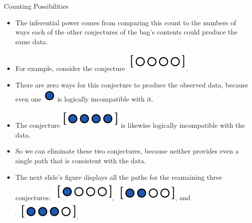 \documentclass[handout]{beamer}
\begin{document}
\begin{frame}{Counting Possibilities}
\scriptsize{
\begin{itemize}
 \item The inferential power comes from comparing this count to the numbers of ways each of the other conjectures of the bag's contents could produce the same data. 
 \item For example, consider the conjecture \includegraphics[scale=0.3]{pics/marbles10.png}. 
 \item There are zero ways for this conjecture to produce the observed data, because even one \includegraphics[scale=0.3]{pics/marbles6.png} is logically incompatible with it. 
\item The conjecture \includegraphics[scale=0.3]{pics/marbles11.png} is likewise logically incompatible with the data. 
\item So we can eliminate these two conjectures, because neither provides even a single path that is consistent with the data.
\item The next slide's figure displays all the paths for the reamaining three conjectures: \includegraphics[scale=0.3]{pics/marbles3.png}, \includegraphics[scale=0.3]{pics/marbles13.png}, and \includegraphics[scale=0.3]{pics/marbles14.png}.

\end{itemize}
 } 
\end{frame}
\end{document}
